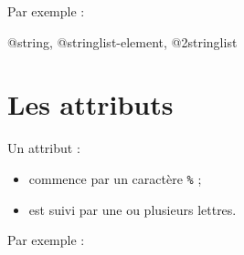 Par exemple :
\begin{galgas}
 @string, @stringlist-element, @2stringlist
\end{galgas}




\section{Les attributs}

Un attribut :
\begin{itemize}
  \item commence par un caractère \texttt{\%} ;
  \item est suivi par une ou plusieurs lettres.
\end{itemize}

Par exemple :
\begin{galgas}
\end{galgas}


